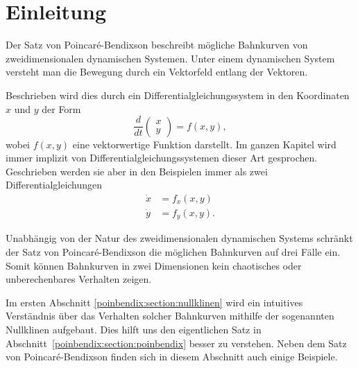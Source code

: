 \section{Einleitung} \label{poinbendix:section:einleitung}
%
Der Satz von Poincaré-Bendixson beschreibt mögliche Bahnkurven von zweidimensionalen dynamischen Systemen.
%
%
Unter einem dynamischen System versteht man die Bewegung durch ein Vektorfeld entlang der Vektoren.

Beschrieben wird dies durch ein Differentialgleichungssystem in den Koordinaten $x$ und $y$ der Form
\begin{equation*}
\frac{d}{dt}
\begin{pmatrix}x\\y\end{pmatrix}
=
f(x,y),
\end{equation*}
wobei $f(x,y)$ eine vektorwertige Funktion darstellt.
Im ganzen Kapitel wird immer implizit von Differentialgleichungssystemen dieser Art gesprochen.
Geschrieben werden sie aber in den Beispielen immer als zwei Differentialgleichungen
\begin{align*}
    \dot{x} &= f_x(x, y) \\
    \dot{y} &= f_y(x, y).
\end{align*}

Unabhängig von der Natur des zweidimensionalen dynamischen Systems schränkt der Satz von Poincaré-Bendixson die möglichen Bahnkurven auf drei Fälle ein.
Somit können Bahnkurven in zwei Dimensionen kein chaotisches oder unberechenbares Verhalten zeigen.
%

Im ersten Abschnitt \ref{poinbendix:section:nullklinen} wird ein intuitives Verständnis über das Verhalten solcher Bahnkurven mithilfe der sogenannten Nullklinen aufgebaut.
Dies hilft uns den eigentlichen Satz in Abschnitt~\ref{poinbendix:section:poinbendix} besser zu verstehen.
Neben dem Satz von Poincaré-Bendixson finden sich in diesem Abschnitt auch einige Beispiele.
